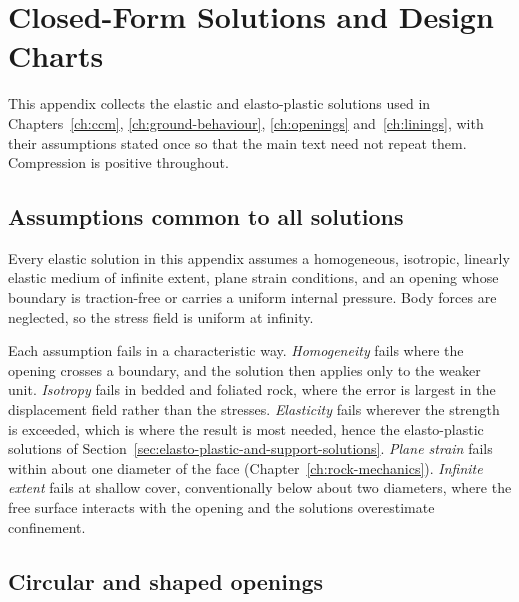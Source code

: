 \chapter{Closed-Form Solutions and Design Charts}
\label{app:closed-form}

This appendix collects the elastic and elasto-plastic solutions used
in Chapters~\ref{ch:ccm}, \ref{ch:ground-behaviour}, \ref{ch:openings}
and~\ref{ch:linings},
with their assumptions stated once so that the main text need not repeat them.
Compression is positive throughout.

\section{Assumptions common to all solutions}
\label{sec:closed-form-assumptions}

Every elastic solution in this appendix assumes a homogeneous, isotropic, linearly
elastic medium of infinite extent, plane strain conditions, and an opening
whose boundary is traction-free or carries a uniform internal pressure. Body
forces are neglected, so the stress field is uniform at infinity.

Each assumption fails in a characteristic way. \emph{Homogeneity} fails where
the opening crosses a boundary, and the solution then applies only to the
weaker unit. \emph{Isotropy} fails in bedded and foliated rock, where the
error is largest in the displacement field rather than the stresses.
\emph{Elasticity} fails wherever the strength is exceeded, which is
where the result is most needed, hence the elasto-plastic solutions of
Section~\ref{sec:elasto-plastic-and-support-solutions}. \emph{Plane strain}
fails within about one diameter of the face
(Chapter~\ref{ch:rock-mechanics}). \emph{Infinite extent} fails at shallow
cover, conventionally below about two diameters, where the free surface
interacts with the opening and the solutions overestimate confinement.

\section{Circular and shaped openings}
\label{sec:circular-and-shaped-openings}

